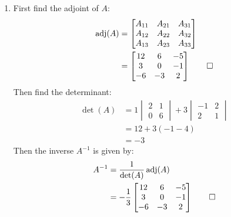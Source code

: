 \documentclass[12pt, a4paper]{article}
\begin{document}
\begin{enumerate}[Q\arabic*.]
  \item First find the adjoint of $A$:
    \begin{align*}
      \operatorname{adj}(A) &= \begin{bmatrix}A_{11}&A_{21}&A_{31}\\A_{12}&A_{22}&A_{32}\\A_{13}&A_{23}&A_{33}\end{bmatrix}\\
              &= \begin{bmatrix}12 & 6 & -5\\ 3 & 0 & -1\\ -6 & -3 & 2\end{bmatrix} \qed
    \end{align*}
    Then find the determinant:
    \begin{align*}
      \det(A) &= 1\begin{vmatrix}2&1\\0&6\end{vmatrix} + 3\begin{vmatrix}-1&2\\2&1\end{vmatrix}\\
              &= 12 + 3(-1 - 4)\\
              &= -3          
    \end{align*}
    Then the inverse $A^{-1}$ is given by:
    \begin{align*}
      A^{-1} &= \frac{1}{\det(A)}\operatorname{adj}(A)\\
             &= -\frac{1}{3}\begin{bmatrix}12&6&-5\\3&0&-1\\-6&-3&2\end{bmatrix} \qed
    \end{align*}
\end{enumerate}
\end{document}
